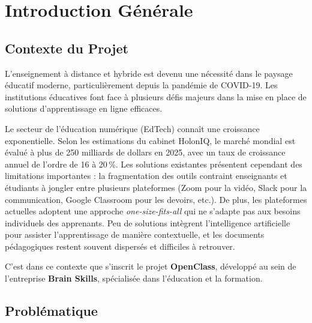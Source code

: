 \documentclass[12pt, a4paper, twoside]{report}
\begin{document}
\setcounter{page}{1}

\tableofcontents
\clearpage

\listoffigures
{}
\clearpage

\listoftables
{}
\clearpage

\setcounter{page}{1}

\chapter{Introduction Générale}

\section{Contexte du Projet}

L'enseignement à distance et hybride est devenu une nécessité dans le paysage
éducatif moderne, particulièrement depuis la pandémie de COVID-19. Les institutions
éducatives font face à plusieurs défis majeurs dans la mise en place de solutions
d'apprentissage en ligne efficaces.

Le secteur de l'éducation numérique (EdTech) connaît une croissance exponentielle.
Selon les estimations du cabinet HolonIQ, le marché mondial est évalué à plus de
250 milliards de dollars en 2025, avec un taux de croissance annuel de l'ordre de
16 à 20\,\%. Les solutions existantes présentent cependant des limitations
importantes : la fragmentation des outils contraint enseignants et étudiants à
jongler entre plusieurs plateformes (Zoom pour la vidéo, Slack pour la
communication, Google Classroom pour les devoirs, etc.). De plus, les plateformes
actuelles adoptent une approche \textit{one-size-fits-all} qui ne s'adapte pas aux
besoins individuels des apprenants. Peu de solutions intègrent l'intelligence
artificielle pour assister l'apprentissage de manière contextuelle, et les
documents pédagogiques restent souvent dispersés et difficiles à retrouver.

C'est dans ce contexte que s'inscrit le projet \textbf{OpenClass}, développé au
sein de l'entreprise \textbf{Brain Skills}, spécialisée dans l'éducation et la
formation.

\section{Problématique}
\end{document}
